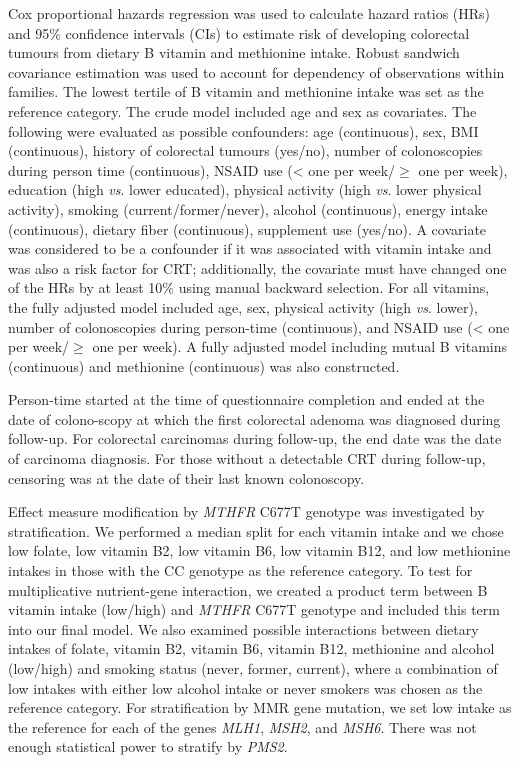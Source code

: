 \noindent Cox proportional hazards regression was used to calculate hazard ratios (HRs) and 95\% confidence intervals (CIs) to estimate risk of developing colorectal tumours from dietary B vitamin and methionine intake. Robust sandwich covariance estimation was used to account for dependency of observations within families. The lowest tertile of B vitamin and methionine intake was set as the reference category. The crude model included age and sex as covariates. The following were evaluated as possible confounders: age (continuous), sex, BMI (continuous), history of colorectal tumours (yes/no), number of colonoscopies during person time (continuous), NSAID use (< one per week/$\geq$ one per week), education (high \emph{vs}. lower educated), physical activity (high \emph{vs}. lower physical activity), smoking (current/former/never), alcohol (continuous), energy intake (continuous), dietary fiber (continuous), supplement use (yes/no). A covariate was considered to be a confounder if it was associated with vitamin intake and was also a risk factor for CRT; additionally, the covariate must have changed one of the HRs by at least 10\% using manual backward selection. For all vitamins, the fully adjusted model included age, sex, physical activity (high \emph{vs}. lower), number of colonoscopies during person-time (continuous), and NSAID use (< one per week/$\geq$ one per week). A fully adjusted model including mutual B vitamins (continuous) and methionine (continuous) was also constructed.

\noindent Person-time started at the time of questionnaire completion and ended at the date of colono-scopy at which the first colorectal adenoma was diagnosed during follow-up. For colorectal carcinomas during follow-up, the end date was the date of carcinoma diagnosis. For those without a detectable CRT during follow-up, censoring was at the date of their last known colonoscopy.

\noindent Effect measure modification by \emph{MTHFR} C677T genotype was investigated by stratification. We performed a median split for each vitamin intake and we chose low folate, low vitamin B2, low vitamin B6, low vitamin B12, and low methionine intakes in those with the CC genotype as the reference category. To test for multiplicative nutrient-gene interaction, we created a product term between B vitamin intake (low/high) and \emph{MTHFR} C677T genotype and included this term into our final model. We also examined possible interactions between dietary intakes of folate, vitamin B2, vitamin B6, vitamin B12, methionine and alcohol (low/high) and smoking status (never, former, current), where a combination of low intakes with either low alcohol intake or never smokers was chosen as the reference category. For stratification by MMR gene mutation, we set low intake as the reference for each of the genes \emph{MLH1}, \emph{MSH2}, and \emph{MSH6}. There was not enough statistical power to stratify by \emph{
PMS2}.

